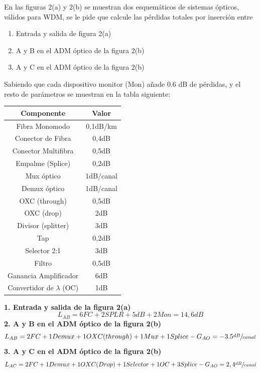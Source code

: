 \begin{exercise}[8]
	En las figuras 2(a) y 2(b) se muestran dos esquemáticos de sistemas ópticos, válidos para WDM, se le pide que calcule las pérdidas totales por inserción entre
\begin{enumerate}
	\item Entrada y salida de figura 2(a)
	\item A y B en el ADM óptico de la figura 2(b)
	\item A y C en el ADM óptico de la figura 2(b)
\end{enumerate}
Sabiendo que cada dispositivo monitor (Mon) añade 0.6 dB de pérdidas, y el resto de parámetros se muestran en la tabla siguiente:
\begin{center}
\begin{tabular}{c | c}
\hline
	\textbf{Componente} 	& \textbf{Valor}\\\hline
	Fibra Monomodo			& 0,1dB/km\\
	Conector de Fibra		& 0,4dB\\
	Conector Multifibra		& 0,5dB\\
	Empalme (Splice)		& 0,2dB\\
	Mux óptico				& 1dB/canal\\
	Demux óptico			& 1dB/canal\\
	OXC (through)			& 0,5dB\\
	OXC (drop)				& 2dB\\
	Divisor (splitter)		& 3dB\\
	Tap						& 0,2dB\\
	Selector 2:1			& 3dB\\
	Filtro					& 0,5dB\\
	Ganancia Amplificador	& 6dB\\
	Convertidor de $\lambda$ (OC)	& 1dB\\\hline
\end{tabular}
\end{center}
\textbf{1. Entrada y salida de la figura 2(a)}\\
\[L_{AB}=6FC+2SPLR+5dB+2Mon=14,6dB\] 
\textbf{2. A y B en el ADM óptico de la figura 2(b)}\\
\[L_{AB}=2FC+1Demux+1OXC(through)+1Mux+1Splice-G_{AO}=-3.5\sfrac{dB}{canal}\]
\textbf{3. A y C en el ADM óptico de la figura 2(b)}\\
\[L_{AC}=2FC+1Demux+1OXC(Drop)+1Selector+1OC+3Splice-G_{AO}=2,4\sfrac{dB}{canal}\]
\end{exercise}
